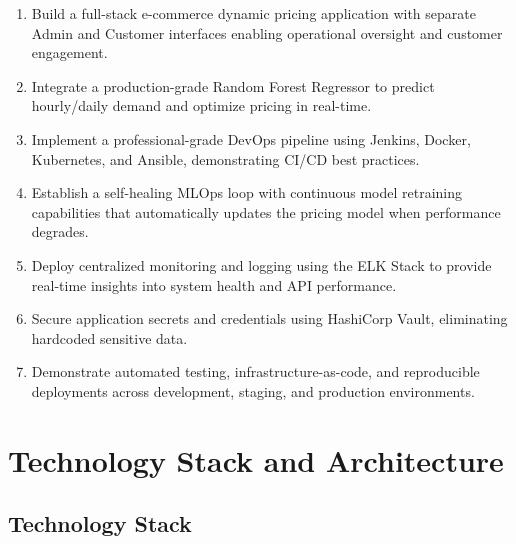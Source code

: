 \documentclass[12pt,a4paper]{report}
\begin{document}
\begin{enumerate}[leftmargin=2em]
    \item Build a full-stack e-commerce dynamic pricing application with separate Admin and Customer interfaces enabling operational oversight and customer engagement.
    
    \item Integrate a production-grade Random Forest Regressor to predict hourly/daily demand and optimize pricing in real-time.
    
    \item Implement a professional-grade DevOps pipeline using Jenkins, Docker, Kubernetes, and Ansible, demonstrating CI/CD best practices.
    
    \item Establish a self-healing MLOps loop with continuous model retraining capabilities that automatically updates the pricing model when performance degrades.
    
    \item Deploy centralized monitoring and logging using the ELK Stack to provide real-time insights into system health and API performance.
    
    \item Secure application secrets and credentials using HashiCorp Vault, eliminating hardcoded sensitive data.
    
    \item Demonstrate automated testing, infrastructure-as-code, and reproducible deployments across development, staging, and production environments.
\end{enumerate}

\chapter{Technology Stack and Architecture}

\section{Technology Stack}
\end{document}
